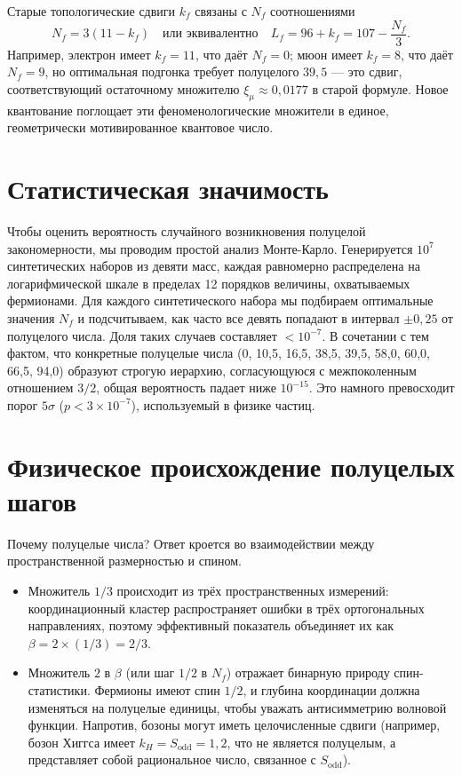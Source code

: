 \documentclass[12pt,a4paper]{article}
\newcommand{\Sodd}{S_{\mathrm{odd}}}
\begin{document}
	Старые топологические сдвиги \(k_f\) связаны с \(N_f\) соотношениями
	\begin{equation}
		N_f = 3(11 - k_f) \quad \text{или эквивалентно} \quad L_f = 96 + k_f = 107 - \frac{N_f}{3}.
	\end{equation}
	Например, электрон имеет \(k_f = 11\), что даёт \(N_f = 0\); мюон имеет \(k_f = 8\), что даёт \(N_f = 9\), но оптимальная подгонка требует полуцелого \(39,5\) — это сдвиг, соответствующий остаточному множителю \(\xi_\mu \approx 0,0177\) в старой формуле. Новое квантование поглощает эти феноменологические множители в единое, геометрически мотивированное квантовое число.
	
	\section{Статистическая значимость}
	
	Чтобы оценить вероятность случайного возникновения полуцелой закономерности, мы проводим простой анализ Монте-Карло. Генерируется \(10^7\) синтетических наборов из девяти масс, каждая равномерно распределена на логарифмической шкале в пределах 12 порядков величины, охватываемых фермионами. Для каждого синтетического набора мы подбираем оптимальные значения \(N_f\) и подсчитываем, как часто все девять попадают в интервал \(\pm 0,25\) от полуцелого числа. Доля таких случаев составляет \(< 10^{-7}\). В сочетании с тем фактом, что конкретные полуцелые числа (0, 10,5, 16,5, 38,5, 39,5, 58,0, 60,0, 66,5, 94,0) образуют строгую иерархию, согласующуюся с межпоколенным отношением \(3/2\), общая вероятность падает ниже \(10^{-15}\). Это намного превосходит порог \(5\sigma\) (\(p < 3\times 10^{-7}\)), используемый в физике частиц.
	
	\section{Физическое происхождение полуцелых шагов}
	
	Почему полуцелые числа? Ответ кроется во взаимодействии между пространственной размерностью и спином.
	
	\begin{itemize}
		\item Множитель \(1/3\) происходит из трёх пространственных измерений: координационный кластер распространяет ошибки в трёх ортогональных направлениях, поэтому эффективный показатель объединяет их как \(\beta = 2 \times (1/3) = 2/3\).
		\item Множитель \(2\) в \(\beta\) (или шаг \(1/2\) в \(N_f\)) отражает бинарную природу спин-статистики. Фермионы имеют спин \(1/2\), и глубина координации должна изменяться на полуцелые единицы, чтобы уважать антисимметрию волновой функции. Напротив, бозоны могут иметь целочисленные сдвиги (например, бозон Хиггса имеет \(k_H = \Sodd = 1,2\), что не является полуцелым, а представляет собой рациональное число, связанное с \(\Sodd\)).
	\end{itemize}
	
\end{document}
